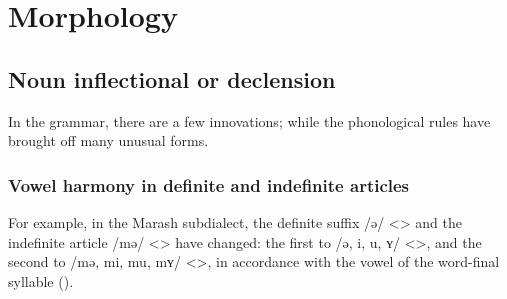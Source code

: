 \section{Morphology}

\subsection{Noun inflectional or declension}
In the grammar, there are a few innovations; while the phonological rules have brought off many unusual forms.



\begin{adjarianpage}\label{page:202}\end{adjarianpage}%



\subsubsection{Vowel harmony in definite and indefinite articles}

For example, in the Marash subdialect, the definite suffix /ə/ <> and the indefinite article /mə/ <> have changed: the first to /ə, i, u, ʏ/ <>, and the second to /mə, mi, mu, mʏ/ <>, in accordance with the vowel of the word-final syllable ().




